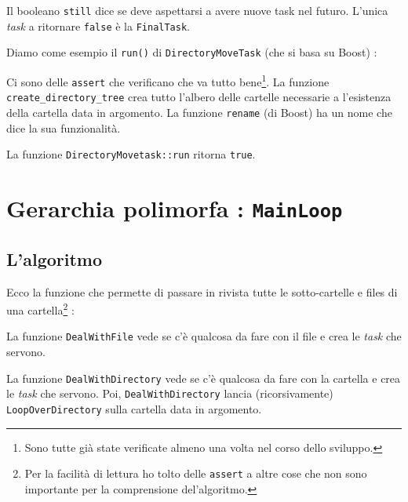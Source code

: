 \documentclass[a4paper,12pt]{article}
\newcommand{\info}[1]{\texttt{#1}}
\begin{document}
Il booleano \info{still} dice se deve aspettarsi a avere nuove task nel futuro. L'unica \emph{task} a ritornare \info{false} è la \info{FinalTask}.

Diamo come esempio il \info{run()} di \info{DirectoryMoveTask} (che si basa su Boost) :



Ci sono delle \info{assert} che verificano che va tutto bene\footnote{Sono tutte già state verificate almeno una volta nel corso dello sviluppo.}. La funzione \info{create\_directory\_tree} crea tutto l'albero delle cartelle necessarie a l'esistenza della cartella data in argomento. La funzione \info{rename} (di Boost) ha un nome che dice la sua funzionalità.

La funzione \info{DirectoryMovetask::run} ritorna \info{true}.

\section{Gerarchia polimorfa : \info{MainLoop}}

\subsection{L'algoritmo}

Ecco la funzione che permette di passare in rivista tutte le sotto-cartelle e files di una cartella\footnote{Per la facilità di lettura ho tolto delle \info{assert} a altre cose che non sono importante per la comprensione del'algoritmo.} :



La funzione \info{DealWithFile} vede se c'è qualcosa da fare con il file e crea le \emph{task} che servono.

La funzione \info{DealWithDirectory} vede se c'è qualcosa da fare con la cartella e crea le \emph{task} che servono. Poi, \info{DealWithDirectory} lancia (ricorsivamente) \info{LoopOverDirectory} sulla cartella data in argomento.
\end{document}
